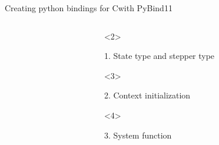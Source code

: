 \documentclass[@BEAMER_OPTIONS@]{beamer}
\newcommand{\CXX}{{\rm C}\plusplus}
\begin{document}
\begin{frame}[fragile]{Creating python bindings for \CXX with PyBind11}
\begin{columns}
\begin{column}[c]{0.25\textwidth}
\begin{exampleblock}{}
            \end{exampleblock}
        \end{column}
        \begin{column}[c]{0.7\textwidth}
            \begin{onlyenv}<2>
                \begin{exampleblock}{1. State type and stepper type}
                    \begin{adjustbox}{width=0.6\textwidth, height=\textheight, keepaspectratio}
                        \begin{minipage}{\textwidth}
                            
                        \end{minipage}
                    \end{adjustbox}
                \end{exampleblock}
            \end{onlyenv}
            \begin{onlyenv}<3>
                \begin{exampleblock}{2. Context initialization}
                    \begin{adjustbox}{width=0.6\textwidth, height=\textheight, keepaspectratio}
                        \begin{minipage}{\textwidth}
                            
                        \end{minipage}
                    \end{adjustbox}
                \end{exampleblock}
            \end{onlyenv}
            \begin{onlyenv}<4>
                \begin{exampleblock}{3. System function}
                    \begin{adjustbox}{width=0.6\textwidth, height=\textheight, keepaspectratio}
                        \begin{minipage}{\textwidth}
                            
                        \end{minipage}
                    \end{adjustbox}
                \end{exampleblock}
            \end{onlyenv}

\end{column}
\end{columns}
\end{frame}
\end{document}
